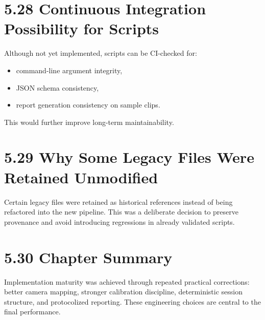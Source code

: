 \section{5.28 Continuous Integration Possibility for Scripts}
Although not yet implemented, scripts can be CI-checked for:
\begin{itemize}
  \item command-line argument integrity,
  \item JSON schema consistency,
  \item report generation consistency on sample clips.
\end{itemize}

This would further improve long-term maintainability.

\section{5.29 Why Some Legacy Files Were Retained Unmodified}
Certain legacy files were retained as historical references instead of being refactored into the new pipeline. This was a deliberate decision to preserve provenance and avoid introducing regressions in already validated scripts.

\section{5.30 Chapter Summary}
Implementation maturity was achieved through repeated practical corrections: better camera mapping, stronger calibration discipline, deterministic session structure, and protocolized reporting. These engineering choices are central to the final performance.
